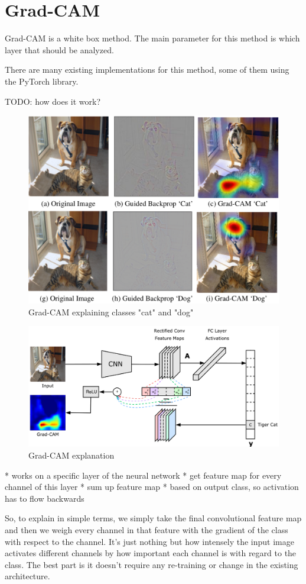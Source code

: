 \section{Grad-CAM}
Grad-CAM is a white box method. The main parameter for this method is which layer that should be analyzed.

There are many existing implementations for this method, some of them using the PyTorch library.

TODO: how does it work?


\begin{figure}[H]
\centering
\includegraphics[width=12cm]{chapters/02_methods/images/grad-cam-example.png}
\caption{Grad-CAM explaining classes "cat" and "dog"}
\end{figure}






\begin{figure}[H]
\centering
\includegraphics[width=12cm]{chapters/02_methods/images/grad-cam.png}
\caption{Grad-CAM explanation}
\end{figure}


* works on a specific layer of the neural network
* get feature map for every channel of this layer
* sum up feature map
* based on output class, so activation has to flow backwards

So, to explain in simple terms, we simply take the final convolutional feature map and then we weigh every channel in that feature with the gradient of the class with respect to the channel. It’s just nothing but how intensely the input image activates different channels by how important each channel is with regard to the class. The best part is it doesn’t require any re-training or change in the existing architecture.